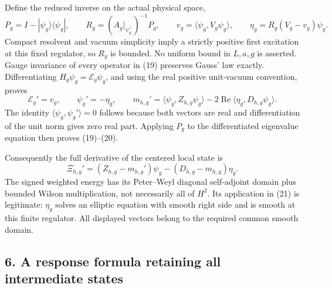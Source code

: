\documentclass[
  11pt,
]{article}
\begin{document}
Define the reduced inverse on the actual physical space, \[
 P_g=I-|\psi_g\rangle\langle\psi_g|,\qquad
 R_g=(A_g|_{\psi_g^\perp})^{-1}P_g,\qquad
 v_g=\langle\psi_g,V_g\psi_g\rangle,\qquad
 \eta_g=R_g(V_g-v_g)\psi_g .
 \tag{19}
\] Compact resolvent and vacuum simplicity imply a strictly positive
first excitation at this fixed regulator, so \(R_g\) is bounded. No
uniform bound in \(L,a,g\) is asserted. Gauge invariance of every
operator in (19) preserves Gauss' law exactly. Differentiating
\(H_g\psi_g=\mathcal E_g\psi_g\), and using the real positive
unit-vacuum convention, proves \[
 \mathcal E_g'=v_g,\qquad
 \psi_g'=-\eta_g,\qquad
 m_{h,g}'=\langle\psi_g,Z_{h,g}\psi_g\rangle
                    -2\operatorname{Re}
                           \langle\eta_g,D_{h,g}\psi_g\rangle .
 \tag{20}
\] The identity \(\langle\psi_g,\psi_g'\rangle=0\) follows because both
vectors are real and differentiation of the unit norm gives zero real
part. Applying \(P_g\) to the differentiated eigenvalue equation then
proves (19)--(20).

Consequently the full derivative of the centered local state is \[
 \boxed{\Xi_{h,g}'=
        (Z_{h,g}-m_{h,g}')\psi_g
                       -(D_{h,g}-m_{h,g})\eta_g.}
 \tag{21}
\] The signed weighted energy has its Peter--Weyl diagonal self-adjoint
domain plus bounded Wilson multiplication, not necessarily all of
\(H^2\). Its application in (21) is legitimate: \(\eta_g\) solves an
elliptic equation with smooth right side and is smooth at this finite
regulator. All displayed vectors belong to the required common smooth
domain.

\subsection{6. A response formula retaining all intermediate
states}\label{weak-coupling-part-11-a-response-formula-retaining-all-intermediate-states}
\end{document}
